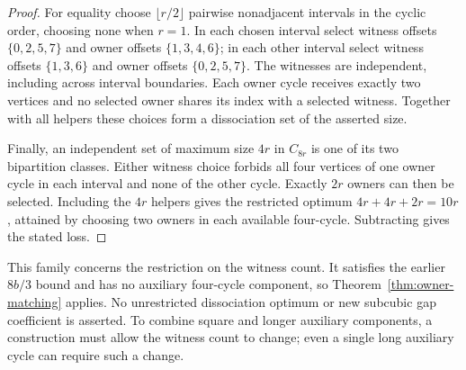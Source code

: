 \begin{proof}
For equality choose $\lfloor r/2\rfloor$ pairwise nonadjacent intervals in
the cyclic order, choosing none when $r=1$. In each chosen interval select
witness offsets $\{0,2,5,7\}$ and owner offsets $\{1,3,4,6\}$; in each
other interval select witness offsets $\{1,3,6\}$ and owner offsets
$\{0,2,5,7\}$. The witnesses are independent, including across interval
boundaries. Each owner cycle receives exactly two vertices and no selected
owner shares its index with a selected witness. Together with all helpers
these choices form a dissociation set of the asserted size.

Finally, an independent set of maximum size $4r$ in $C_{8r}$ is one of its
two bipartition classes. Either witness choice forbids all four vertices
of one owner cycle in each interval and none of the other cycle. Exactly
$2r$ owners can then be selected. Including the $4r$ helpers gives the
restricted optimum $4r+4r+2r=10r$, attained by choosing two owners in each
available four-cycle. Subtracting gives the stated loss.
\end{proof}

This family concerns the restriction on the witness count. It satisfies the
earlier $8b/3$ bound and has no auxiliary four-cycle component, so
Theorem~\ref{thm:owner-matching} applies. No unrestricted dissociation optimum
or new subcubic gap coefficient is asserted. To combine square and longer
auxiliary components, a construction must allow the witness count to change;
even a single long auxiliary cycle can require such a change.
